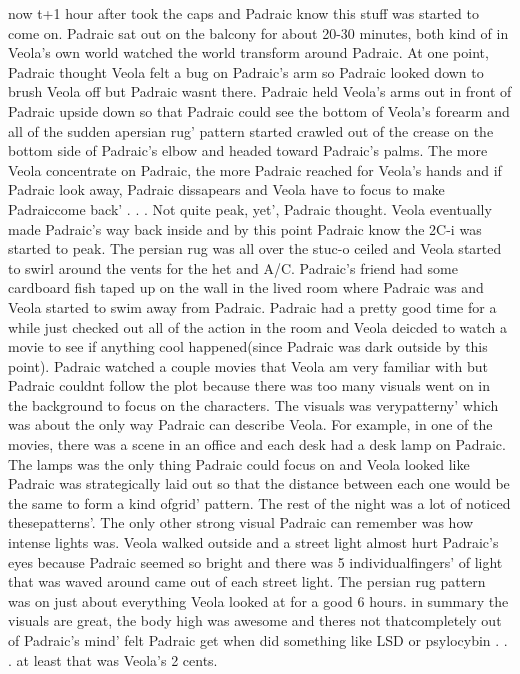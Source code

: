 \documentclass[12pt]{book}
\begin{document}
now t+1 hour after took the caps and Padraic know this stuff was started to come on. Padraic sat out on the balcony for about 20-30 minutes, both kind of in Veola's own world watched the world transform around Padraic. At one point, Padraic thought Veola felt a bug on Padraic's arm so Padraic looked down to brush Veola off but Padraic wasnt there. Padraic held Veola's arms out in front of Padraic upside down so that Padraic could see the bottom of Veola's forearm and all of the sudden apersian rug' pattern started crawled out of the crease on the bottom side of Padraic's elbow and headed toward Padraic's palms. The more Veola concentrate on Padraic, the more Padraic reached for Veola's hands and if Padraic look away, Padraic dissapears and Veola have to focus to make Padraiccome back' . . . Not quite peak, yet', Padraic thought. Veola eventually made Padraic's way back inside and by this point Padraic know the 2C-i was started to peak. The persian rug was all over the stuc-o ceiled and Veola started to swirl around the vents for the het and A/C. Padraic's friend had some cardboard fish taped up on the wall in the lived room where Padraic was and Veola started to swim away from Padraic. Padraic had a pretty good time for a while just checked out all of the action in the room and Veola deicded to watch a movie to see if anything cool happened(since Padraic was dark outside by this point). Padraic watched a couple movies that Veola am very familiar with but Padraic couldnt follow the plot because there was too many visuals went on in the background to focus on the characters. The visuals was verypatterny' which was about the only way Padraic can describe Veola. For example, in one of the movies, there was a scene in an office and each desk had a desk lamp on Padraic. The lamps was the only thing Padraic could focus on and Veola looked like Padraic was strategically laid out so that the distance between each one would be the same to form a kind ofgrid' pattern. The rest of the night was a lot of noticed thesepatterns'. The only other strong visual Padraic can remember was how intense lights was. Veola walked outside and a street light almost hurt Padraic's eyes because Padraic seemed so bright and there was 5 individualfingers' of light that was waved around came out of each street light. The persian rug pattern was on just about everything Veola looked at for a good 6 hours. in summary the visuals are great, the body high was awesome and theres not thatcompletely out of Padraic's mind' felt Padraic get when did something like LSD or psylocybin . . .  at least that was Veola's 2 cents.
\end{document}
